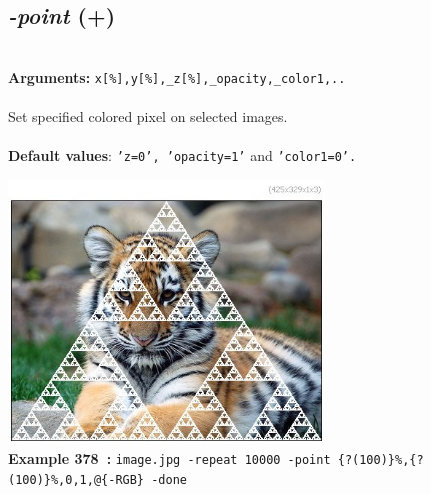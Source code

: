 \documentclass[a4paper,11pt,twoside]{book}
\begin{document}
\subsection{\emph{-point} (+)}\vspace*{-0.5em}
~\\\textbf{Arguments: } 
{\small \texttt{x[\%],y[\%],\_z[\%],\_opacity,\_color1,..}}\\~\\
Set specified colored pixel on selected images.
~\\~\\\textbf{Default values}: {\small \texttt{'z=0', 'opacity=1'} and \texttt{'color1=0'.}}
\begin{center}\includegraphics[keepaspectratio=true,height=7cm,width=\textwidth]{img/gmic_def378.jpg}\\
{\footnotesize \textbf{Example 378~:} \texttt{image.jpg -repeat 10000 -point \{?(100)\}\%,\{?(100)\}\%,0,1,@\{-RGB\} -done}}
\end{center}
\end{document}
